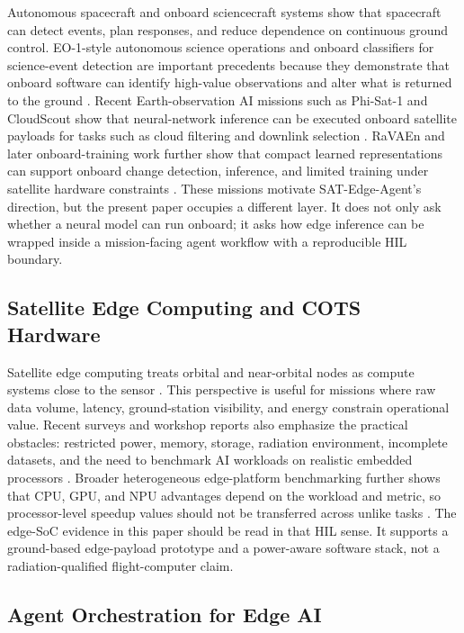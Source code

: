 \documentclass[10pt,letterpaper]{article}
\begin{document}
Autonomous spacecraft and onboard sciencecraft systems show that spacecraft can detect events, plan responses, and reduce dependence on continuous ground control. EO-1-style autonomous science operations and onboard classifiers for science-event detection are important precedents because they demonstrate that onboard software can identify high-value observations and alter what is returned to the ground \cite{eo1_sciencecraft,onboard_classifiers}. Recent Earth-observation AI missions such as Phi-Sat-1 and CloudScout show that neural-network inference can be executed onboard satellite payloads for tasks such as cloud filtering and downlink selection \cite{phisat1,cloudscout}. RaVAEn and later onboard-training work further show that compact learned representations can support onboard change detection, inference, and limited training under satellite hardware constraints \cite{ravaen,fast_onboard_training}. These missions motivate SAT-Edge-Agent's direction, but the present paper occupies a different layer. It does not only ask whether a neural model can run onboard; it asks how edge inference can be wrapped inside a mission-facing agent workflow with a reproducible HIL boundary.

\subsection{Satellite Edge Computing and COTS Hardware}

Satellite edge computing treats orbital and near-orbital nodes as compute systems close to the sensor \cite{oec_asplos,satedge_tcom}. This perspective is useful for missions where raw data volume, latency, ground-station visibility, and energy constrain operational value. Recent surveys and workshop reports also emphasize the practical obstacles: restricted power, memory, storage, radiation environment, incomplete datasets, and the need to benchmark AI workloads on realistic embedded processors \cite{ai_onboard_survey,gardill_space_edge}. Broader heterogeneous edge-platform benchmarking further shows that CPU, GPU, and NPU advantages depend on the workload and metric, so processor-level speedup values should not be transferred across unlike tasks \cite{edge_ai_platform_benchmark}. The edge-SoC evidence in this paper should be read in that HIL sense. It supports a ground-based edge-payload prototype and a power-aware software stack, not a radiation-qualified flight-computer claim.

\subsection{Agent Orchestration for Edge AI}
\end{document}
